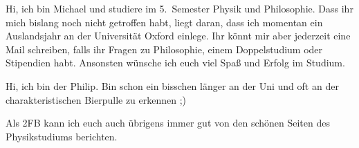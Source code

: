 \begin{multicols*}{2}
{Hi, ich bin Michael und studiere im 5.~Semester Physik und Philosophie.
Dass ihr mich bislang noch nicht getroffen habt, liegt daran, dass ich momentan ein Auslandsjahr an der Universität Oxford einlege.
Ihr könnt mir aber jederzeit eine Mail schreiben, falls ihr Fragen zu Philosophie, einem Doppelstudium oder Stipendien habt.
Ansonsten wünsche ich euch viel Spaß und Erfolg im Studium.}

{Hi, ich bin der Philip. Bin schon ein bisschen länger an der Uni und oft an der charakteristischen Bierpulle zu erkennen ;)

Als 2FB kann ich euch auch übrigens immer gut von den schönen Seiten des Physikstudiums berichten.
\vspace{\baselineskip}}


\end{multicols*}
